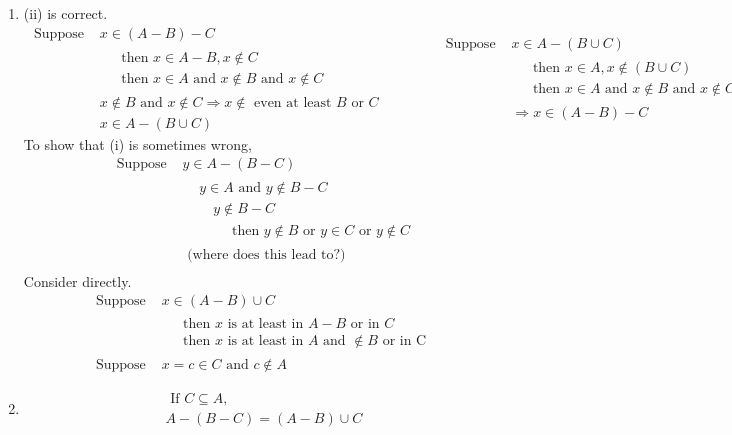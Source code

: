 \documentclass[twoside]{amsart}
\theoremstyle{plain}
\theoremstyle{definition}
\newcommand{\exercisehead}[1]
  {\smallskip
   \noindent{\small\bf Exercise #1.}}
\begin{document}
\exercisehead{20} 
\begin{enumerate}
\item (ii) is correct.  \\
  \[
  \begin{aligned}
    \text{ Suppose } & x \in (A - B) - C \\
    & \begin{aligned}
      & \text{ then } x \in A-B, x\notin C \\
      & \text{ then } x \in A \text{ and } x \notin B \text{ and } x \notin C 
      \end{aligned} \\
    & x \notin B \text{ and } x \notin C \Longrightarrow x \notin \text{ even at least $B$ or $C$ } \\
    & x \in A - (B \cup C )
  \end{aligned}
  \quad \quad \quad 
  \begin{aligned}
    \text{ Suppose } & x \in A - (B \cup C) \\
    & \begin{aligned}
      & \text{ then } x \in A, x\notin (B \cup C) \\
      & \text{ then } x \in A \text{ and } x \notin B \text{ and } x \notin C 
      \end{aligned} \\
      & \Longrightarrow x \in (A - B) - C 
  \end{aligned}
  \]
  To show that (i) is sometimes wrong, \\
  \[
\begin{aligned}
  \text{ Suppose } & y \in A - (B - C) \\
&  \begin{aligned}
    & y \in A  \text{ and } y \notin B - C \\
    & \quad y \notin B - C \\ 
    & \quad \quad \text{ then } y \notin B \text{ or } y \in C \text{ or } y \notin C 
  \end{aligned} \\
& \text{ (where does this lead to?) } \\
\end{aligned}
  \]
Consider directly. 
\[
\begin{aligned}
  \text{ Suppose } & x \in ( A- B) \cup C \\
&  \begin{aligned}
    & \text{ then $x$ is at least in $A-B$ or in $C$ } \\
    & \text{ then $x$ is at least in $A$ and $\notin B$ or in C } 
  \end{aligned} \\
  \text{ Suppose } & x = c \in C \text{ and } c \notin A
\end{aligned}
\]
\item \[
\begin{gathered}
  \text{ If } C \subseteq A, \\
  A- ( B- C) = (A-B) \cup C
\end{gathered}
\] 
\end{enumerate}
\end{document}
